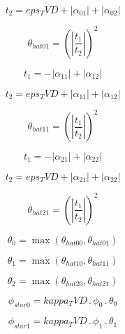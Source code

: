 \documentclass{article}
\begin{document}
\begin{dmath}t_{2} = eps_TVD + \left|{\alpha_{01}}\right| + \left|{\alpha_{02}}\right|\end{dmath}

\begin{dmath}\theta_{hat 01} = \left(\left|{\frac{t_{1}}{t_{2}}}\right| \right)^{2}\end{dmath}

\begin{dmath}t_{1} = - \left|{\alpha_{11}}\right| + \left|{\alpha_{12}}\right|\end{dmath}

\begin{dmath}t_{2} = eps_TVD + \left|{\alpha_{11}}\right| + \left|{\alpha_{12}}\right|\end{dmath}

\begin{dmath}\theta_{hat 11} = \left(\left|{\frac{t_{1}}{t_{2}}}\right| \right)^{2}\end{dmath}

\begin{dmath}t_{1} = - \left|{\alpha_{21}}\right| + \left|{\alpha_{22}}\right|\end{dmath}

\begin{dmath}t_{2} = eps_TVD + \left|{\alpha_{21}}\right| + \left|{\alpha_{22}}\right|\end{dmath}

\begin{dmath}\theta_{hat 21} = \left(\left|{\frac{t_{1}}{t_{2}}}\right| \right)^{2}\end{dmath}

\begin{dmath}\theta_{0} = \max\left(\theta_{hat 00}, \theta_{hat 01}\right)\end{dmath}

\begin{dmath}\theta_{1} = \max\left(\theta_{hat 10}, \theta_{hat 11}\right)\end{dmath}

\begin{dmath}\theta_{2} = \max\left(\theta_{hat 20}, \theta_{hat 21}\right)\end{dmath}

\begin{dmath}\phi_{star 0} = kappa_TVD \,.\, \phi_{0} \,.\, \theta_{0}\end{dmath}

\begin{dmath}\phi_{star 1} = kappa_TVD \,.\, \phi_{1} \,.\, \theta_{1}\end{dmath}
\end{document}
